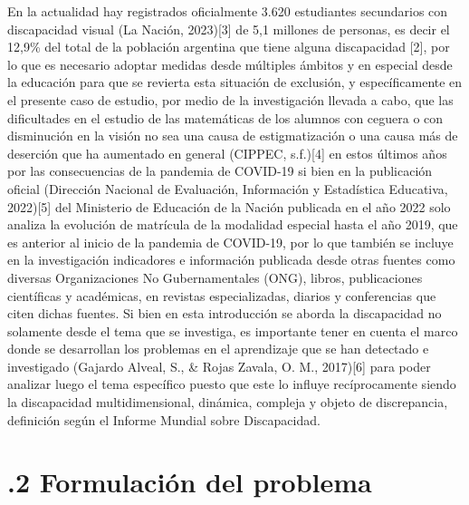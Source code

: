 \documentclass{article}
\begin{document}
{\changefontsizes{8.8pt}
En la actualidad hay registrados oficialmente 3.620 estudiantes secundarios con discapacidad visual (La Nación, 2023)[3]  de 5,1 millones de personas, es decir el 12,9\% del total de la población argentina que tiene alguna discapacidad [2], por lo que es necesario adoptar medidas desde múltiples ámbitos y en especial desde la educación para que se revierta esta situación de exclusión, y específicamente en el presente caso de estudio, por medio de la investigación llevada a cabo, que las dificultades en el estudio de las matemáticas de los alumnos con ceguera o con disminución en la visión no sea una causa de estigmatización o una causa más de deserción que ha aumentado en general (CIPPEC, s.f.)[4] en estos últimos años por las consecuencias de la pandemia de COVID-19 si bien en la publicación oficial (Dirección Nacional de Evaluación, Información y Estadística Educativa, 2022)[5] del Ministerio de Educación de la Nación publicada en el año 2022 solo analiza la evolución de matrícula de la modalidad especial hasta el año 2019, que es anterior al inicio de la pandemia de COVID-19, por lo que también se incluye en la investigación indicadores e información publicada desde otras fuentes como diversas Organizaciones No Gubernamentales (ONG), libros, publicaciones científicas y académicas, en revistas especializadas, diarios y conferencias que citen dichas fuentes.
Si bien en esta introducción se aborda la discapacidad no solamente desde el tema que se investiga, es importante tener en cuenta el marco donde se desarrollan los problemas en el aprendizaje que se han detectado e investigado (Gajardo Alveal, S., \& Rojas Zavala, O. M., 2017)[6] para poder analizar luego el tema específico puesto que este lo influye recíprocamente siendo la discapacidad multidimensional, dinámica, compleja y objeto de discrepancia, definición según el Informe Mundial sobre Discapacidad. 
}

\section{\fontsize{10pt}{14pt}.2 Formulación del problema}
\end{document}
